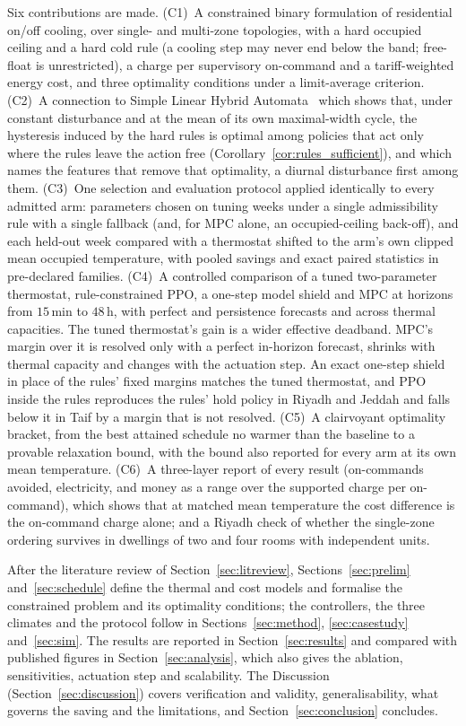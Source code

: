 \documentclass[3p,twocolumn,number]{elsarticle}
\begin{document}
Six contributions are made. (C1)~A constrained binary formulation of residential on/off cooling, over single- and multi-zone topologies, with a hard occupied ceiling and a hard cold rule (a cooling step may never end below the band; free-float is unrestricted), a charge per supervisory on-command and a tariff-weighted energy cost, and three optimality conditions under a limit-average criterion. (C2)~A connection to Simple Linear Hybrid Automata~\cite{Mousa2016} which shows that, under constant disturbance and at the mean of its own maximal-width cycle, the hysteresis induced by the hard rules is optimal among policies that act only where the rules leave the action free (Corollary~\ref{cor:rules_sufficient}), and which names the features that remove that optimality, a diurnal disturbance first among them. (C3)~One selection and evaluation protocol applied identically to every admitted arm: parameters chosen on tuning weeks under a single admissibility rule with a single fallback (and, for MPC alone, an occupied-ceiling back-off), and each held-out week compared with a thermostat shifted to the arm's own clipped mean occupied temperature, with pooled savings and exact paired statistics in pre-declared families. (C4)~A controlled comparison of a tuned two-parameter thermostat, rule-constrained PPO, a one-step model shield and MPC at horizons from $15\,$min to $48\,$h, with perfect and persistence forecasts and across thermal capacities. The tuned thermostat's gain is a wider effective deadband. MPC's margin over it is resolved only with a perfect in-horizon forecast, shrinks with thermal capacity and changes with the actuation step. An exact one-step shield in place of the rules' fixed margins matches the tuned thermostat, and PPO inside the rules reproduces the rules' hold policy in Riyadh and Jeddah and falls below it in Taif by a margin that is not resolved. (C5)~A clairvoyant optimality bracket, from the best attained schedule no warmer than the baseline to a provable relaxation bound, with the bound also reported for every arm at its own mean temperature. (C6)~A three-layer report of every result (on-commands avoided, electricity, and money as a range over the supported charge per on-command), which shows that at matched mean temperature the cost difference is the on-command charge alone; and a Riyadh check of whether the single-zone ordering survives in dwellings of two and four rooms with independent units.

After the literature review of Section~\ref{sec:litreview}, Sections~\ref{sec:prelim} and~\ref{sec:schedule} define the thermal and cost models and formalise the constrained problem and its optimality conditions; the controllers, the three climates and the protocol follow in Sections~\ref{sec:method}, \ref{sec:casestudy} and~\ref{sec:sim}. The results are reported in Section~\ref{sec:results} and compared with published figures in Section~\ref{sec:analysis}, which also gives the ablation, sensitivities, actuation step and scalability. The Discussion (Section~\ref{sec:discussion}) covers verification and validity, generalisability, what governs the saving and the limitations, and Section~\ref{sec:conclusion} concludes.
 
\end{document}
